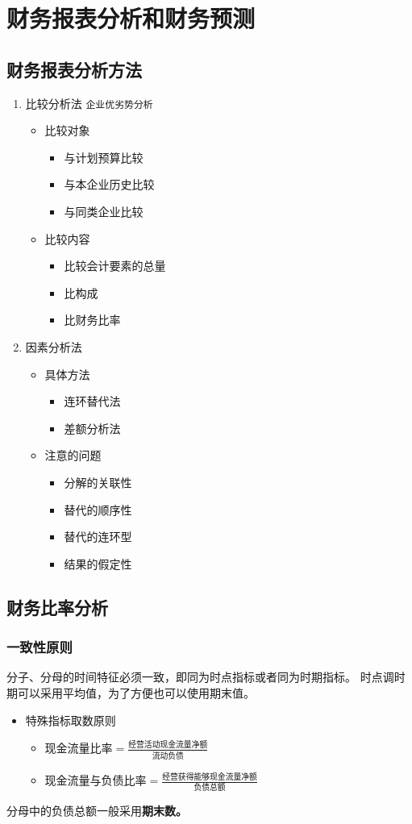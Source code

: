 \documentclass[11pt]{article}
\begin{document}
\section{财务报表分析和财务预测}
\label{sec:org1bcc3da}
\subsection{财务报表分析方法}
\label{sec:org35f1999}
\begin{enumerate}
\item 比较分析法
\texttt{企业优劣势分析}
\begin{itemize}
\item 比较对象
\begin{itemize}
\item 与计划预算比较
\item 与本企业历史比较
\item 与同类企业比较
\end{itemize}
\item 比较内容
\begin{itemize}
\item 比较会计要素的总量
\item 比构成
\item 比财务比率
\end{itemize}
\end{itemize}
\item 因素分析法
\begin{itemize}
\item 具体方法
\begin{itemize}
\item 连环替代法
\item 差额分析法
\end{itemize}
\item 注意的问题
\begin{itemize}
\item 分解的关联性
\item 替代的顺序性
\item 替代的连环型
\item 结果的假定性
\end{itemize}
\end{itemize}
\end{enumerate}
\subsection{财务比率分析}
\label{sec:orgb0283a7}
\subsubsection{一致性原则}
\label{sec:org4347643}
分子、分母的时间特征必须一致，即同为时点指标或者同为时期指标。
时点调时期可以采用平均值，为了方便也可以使用期末值。
\begin{itemize}
\item 特殊指标取数原则
\begin{itemize}
\item \(现金流量比率=\frac{经营活动现金流量净额}{流动负债}\)
\item \(现金流量与负债比率=\frac{经营获得能够现金流量净额}{负债总额}\)
\end{itemize}
\end{itemize}
分母中的负债总额一般采用\textbf{期末数。}
\end{document}
